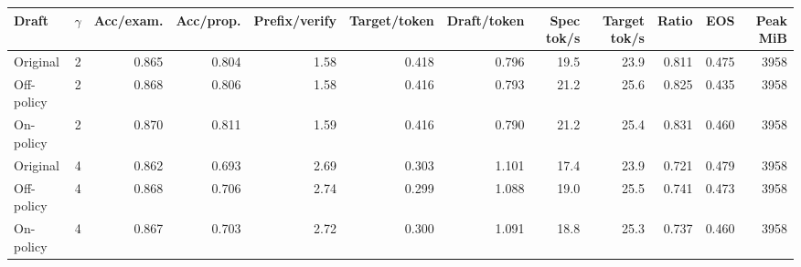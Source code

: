 \scriptsize
\setlength{\tabcolsep}{3.5pt}
\label{tab:t3speedmean}
\begin{adjustbox}{max width=\linewidth}
\begin{tabular}{lrrrrrrrrrrr}
\toprule
Draft & $\gamma$ & Acc/exam. & Acc/prop. & Prefix/verify & Target/token & Draft/token & Spec tok/s & Target tok/s & Ratio & EOS & Peak MiB \\
\midrule
Original & 2 & 0.865 & 0.804 & 1.58 & 0.418 & 0.796 & 19.5 & 23.9 & 0.811 & 0.475 & 3958 \\
Off-policy & 2 & 0.868 & 0.806 & 1.58 & 0.416 & 0.793 & 21.2 & 25.6 & 0.825 & 0.435 & 3958 \\
On-policy & 2 & 0.870 & 0.811 & 1.59 & 0.416 & 0.790 & 21.2 & 25.4 & 0.831 & 0.460 & 3958 \\
\midrule
Original & 4 & 0.862 & 0.693 & 2.69 & 0.303 & 1.101 & 17.4 & 23.9 & 0.721 & 0.479 & 3958 \\
Off-policy & 4 & 0.868 & 0.706 & 2.74 & 0.299 & 1.088 & 19.0 & 25.5 & 0.741 & 0.473 & 3958 \\
On-policy & 4 & 0.867 & 0.703 & 2.72 & 0.300 & 1.091 & 18.8 & 25.3 & 0.737 & 0.460 & 3958 \\
\bottomrule
\end{tabular}
\end{adjustbox}
